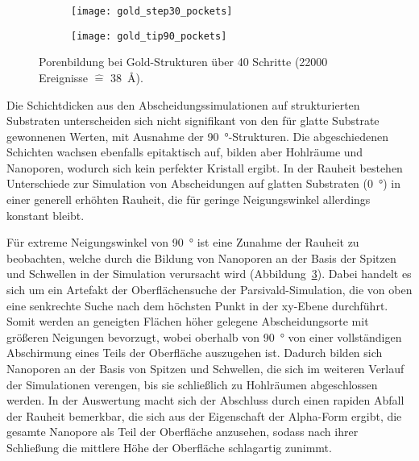 \begin{figure}[p]
  \captionsetup[subfigure]{singlelinecheck=false}
  \def\subfigwidth{0.49\textwidth}

  \begin{subfigure}[t]{\subfigwidth}
    \texttt{[image: gold\_step30\_pockets]}
    \label{fig:goldpockets-a}
  \end{subfigure}
  \hfill
  \begin{subfigure}[t]{\subfigwidth}
    \texttt{[image: gold\_tip90\_pockets]}
    \label{fig:goldpockets-b}
  \end{subfigure}

  \caption[Porenbildung bei Gold-Strukturen]{Porenbildung bei Gold-Strukturen über \num{40} Schritte (\num{22000} Ereignisse $\hat{=}$ \SI{38}{\angstrom}).
  }
  \label{fig:goldpockets}
\end{figure}

Die Schichtdicken aus den Abscheidungssimulationen auf strukturierten Substraten unterscheiden sich nicht signifikant von den für glatte Substrate gewonnenen Werten, mit Ausnahme der \SI{90}{\degree}-Strukturen.
Die abgeschiedenen Schichten wachsen ebenfalls epitaktisch auf, bilden aber Hohlräume und Nanoporen, wodurch sich kein perfekter Kristall ergibt.
In der Rauheit bestehen Unterschiede zur Simulation von Abscheidungen auf glatten Substraten (\SI{0}{\degree}) in einer generell erhöhten Rauheit, die für geringe Neigungswinkel allerdings konstant bleibt.

Für extreme Neigungswinkel von \SI{90}{\degree} ist eine Zunahme der Rauheit zu beobachten, welche durch die Bildung von Nanoporen an der Basis der Spitzen und Schwellen in der Simulation verursacht wird (Abbildung~\ref{fig:goldpockets}).
Dabei handelt es sich um ein Artefakt der Oberflächensuche der Parsivald-Simulation, die von oben eine senkrechte Suche nach dem höchsten Punkt in der xy-Ebene durchführt.
Somit werden an geneigten Flächen höher gelegene Abscheidungsorte mit größeren Neigungen bevorzugt, wobei oberhalb von \SI{90}{\degree} von einer vollständigen Abschirmung eines Teils der Oberfläche auszugehen ist.
Dadurch bilden sich Nanoporen an der Basis von Spitzen und Schwellen, die sich im weiteren Verlauf der Simulationen verengen, bis sie schließlich zu Hohlräumen abgeschlossen werden.
In der Auswertung macht sich der Abschluss durch einen rapiden Abfall der Rauheit bemerkbar, die sich aus der Eigenschaft der Alpha-Form ergibt, die gesamte Nanopore als Teil der Oberfläche anzusehen, sodass nach ihrer Schließung die mittlere Höhe der Oberfläche schlagartig zunimmt.

